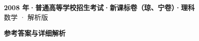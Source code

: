 \documentclass[zihao=-4, a4paper]{ctexart}
\begin{document}
\begin{center}
  {\Large\bfseries 2008 年·普通高等学校招生考试·新课标卷（琼、宁卷）·理科}\\[4pt]
  {\large 数学 · 解析版}
\end{center}
\medskip
{}

\clearpage
{}
\begin{center}{\Large\bfseries 参考答案与详细解析}\end{center}
\medskip

\end{document}
